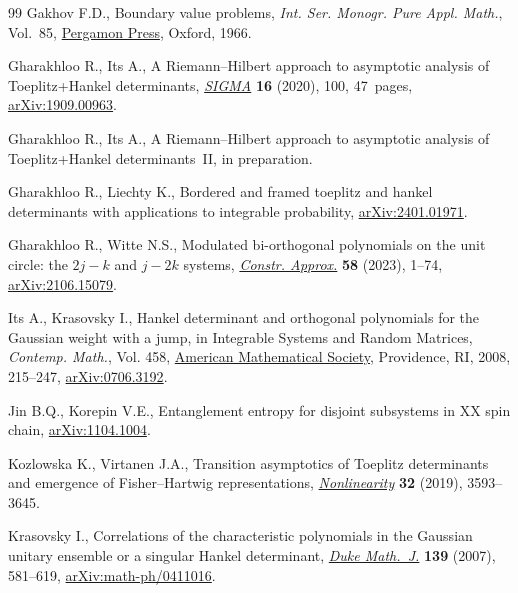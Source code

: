 \begin{thebibliography}{99}
Gakhov F.D., Boundary value problems, \textit{Int. Ser. Monogr. Pure Appl.
 Math.}, Vol.~85, \href{https://doi.org/10.1002/zamm.19670470318}{Pergamon Press}, Oxford, 1966.

Gharakhloo R., Its A., A {R}iemann--{H}ilbert approach to asymptotic analysis
 of {T}oeplitz+{H}ankel determinants, \href{https://doi.org/10.3842/SIGMA.2020.100}{\textit{SIGMA}} \textbf{16} (2020), 100,
 47~pages, \href{https://arxiv.org/abs/1909.00963}{arXiv:1909.00963}.

Gharakhloo R., Its A., A {R}iemann--{H}ilbert approach to asymptotic analysis
 of {T}oeplitz+{H}ankel determinants~{II}, in preparation.

Gharakhloo R., Liechty K., Bordered and framed toeplitz and hankel determinants
 with applications to integrable probability, \href{https://arxiv.org/abs/2401.01971}{arXiv:2401.01971}.

Gharakhloo R., Witte N.S., Modulated bi-orthogonal polynomials on the unit
 circle: the {$2j-k$} and {$j-2k$} systems, \href{https://doi.org/10.1007/s00365-022-09604-2}{\textit{Constr. Approx.}}
 \textbf{58} (2023), 1--74, \href{https://arxiv.org/abs/2106.15079}{arXiv:2106.15079}.

Its A., Krasovsky I., Hankel determinant and orthogonal polynomials for the
 {G}aussian weight with a jump, in Integrable {S}ystems and {R}andom
 {M}atrices, \textit{Contemp. Math.}, Vol. 458, \href{https://doi.org/10.1090/conm/458/08938}{American Mathematical Society}, Providence,
 RI, 2008, 215--247, \href{https://arxiv.org/abs/0706.3192}{arXiv:0706.3192}.

Jin B.Q., Korepin V.E., Entanglement entropy for disjoint subsystems in {XX}
 spin chain, \href{https://arxiv.org/abs/1104.1004}{arXiv:1104.1004}.

Kozlowska K., Virtanen J.A., Transition asymptotics of {T}oeplitz determinants
 and emergence of {F}isher--{H}artwig representations, \href{https://doi.org/10.1088/1361-6544/ab127a}{\textit{Nonlinearity}}
 \textbf{32} (2019), 3593--3645.

Krasovsky I., Correlations of the characteristic polynomials in the
 {G}aussian unitary ensemble or a singular {H}ankel determinant, \href{https://doi.org/10.1215/S0012-7094-07-13936-X}{\textit{Duke
 Math.~J.}} \textbf{139} (2007), 581--619, \href{https://arxiv.org/abs/math-ph/0411016}{arXiv:math-ph/0411016}.


\end{thebibliography}
